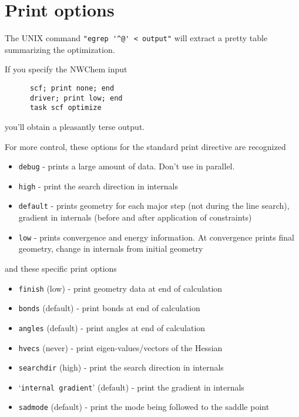 \section{Print options}

The UNIX command \verb+"egrep '^@' < output"+ will extract a pretty
table summarizing the optimization.

If you specify the NWChem input
\begin{verbatim}
      scf; print none; end
      driver; print low; end
      task scf optimize
\end{verbatim}
you'll obtain a pleasantly terse output.

For more control, these options for the standard print directive are
recognized
\begin{itemize}
\item \verb+debug+   - prints a large amount of data.  Don't use in parallel.
\item \verb+high+    - print the search direction in internals
\item \verb+default+ - prints geometry for each major step (not during
                the line search), gradient in internals (before
                and after application of constraints)
\item \verb+low+     - prints convergence and energy information.  At 
                convergence prints final geometry, change in internals
                from initial geometry
\end{itemize}
and these specific print options
\begin{itemize}
\item      {\tt finish} (low)      - print geometry data at end of calculation
\item      {\tt bonds}  (default)  - print bonds at end of calculation
\item      {\tt angles} (default)  - print angles at end of calculation
\item      {\tt hvecs}  (never)    - print eigen-values/vectors of the Hessian
\item      {\tt searchdir} (high)  - print the search direction in internals
\item      `{\tt internal gradient}' (default) - print the gradient in internals
\item      {\tt sadmode} (default) - print the mode being followed to the saddle point
\end{itemize}

\fussy


